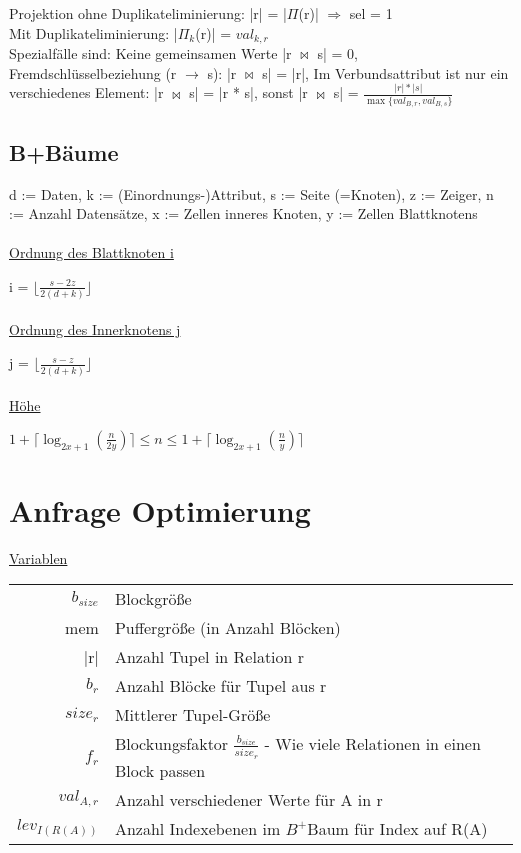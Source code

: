 \documentclass[12pt,a4paper]{article} %
\begin{document}
Projektion ohne Duplikateliminierung: |r| = |$\varPi$(r)| $\Rightarrow$ sel = 1
\\
Mit Duplikateliminierung: |$\varPi_k$(r)| = $val_{k, r}$
\\
Spezialfälle sind: Keine gemeinsamen Werte |r $\bowtie$ s| = 0, Fremdschlüsselbeziehung (r $\rightarrow$ s): |r $\bowtie$ s| = |r|, Im Verbundsattribut ist nur ein verschiedenes Element: |r $\bowtie$ s| = |r * s|, sonst |r $\bowtie$ s| = $\frac{|r| * |s|}{\max\{val_{B, r}, val_{B, s}\}}$

\subsection{B+Bäume}
d := Daten, k := (Einordnungs-)Attribut, s := Seite (=Knoten), z := Zeiger, n := Anzahl Datensätze, x := Zellen inneres Knoten, y := Zellen Blattknotens\\ \\
\underline{Ordnung des Blattknoten i}

i = $\lfloor\frac{s - 2z}{2(d + k)}\rfloor$\\ \\
\underline{Ordnung des Innerknotens j}

j = $\lfloor\frac{s - z}{2(d + k)}\rfloor$ \\ \\ 
\underline{Höhe}

$1 + \lceil \log_{2x + 1}(\frac{n}{2y}) \rceil \le n \le 1 + \lceil \log_{2x + 1}(\frac{n}{y}) \rceil$

\section{Anfrage Optimierung}
\underline{Variablen}

\begin{tabular}{r l}
	$b_{size}$ & Blockgröße \\
	mem & Puffergröße (in Anzahl Blöcken) \\
	|r| & Anzahl Tupel in Relation r \\
	$b_r$ & Anzahl Blöcke für Tupel aus r \\
	$size_r$ & Mittlerer Tupel-Größe \\
	$f_r$ & Blockungsfaktor $\frac{b_{size}}{size_r}$ - Wie viele Relationen in einen Block passen \\
	$val_{A, r}$ & Anzahl verschiedener Werte für A in r \\
	$lev_{I(R(A))}$ & Anzahl Indexebenen im $B^+$Baum für Index auf R(A)
\end{tabular}
\end{document}
